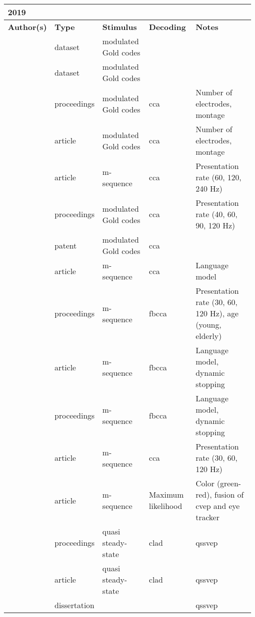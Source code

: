 \documentclass[a4paper,landscape]{article}
\begin{document}
\begin{table}[H]
	\begin{tabular}{p{5cm}p{2cm}p{5cm}p{5cm}p{6.5cm}}
		\textbf{2019} & & & & \\
		\toprule
		\textbf{Author(s)} & \textbf{Type} & \textbf{Stimulus} & \textbf{Decoding} & \textbf{Notes} \\
		\midrule
		\citeauthor{ahmadi2019dataset1} & dataset & modulated Gold codes & & \\
		\citeauthor{ahmadi2019dataset2} & dataset & modulated Gold codes & & \\
		\citeauthor{ahmadi2019a} & proceedings & modulated Gold codes & \acrshort{cca} & Number of electrodes, montage \\
		\citeauthor{ahmadi2019b} & article & modulated Gold codes & \acrshort{cca} & Number of electrodes, montage \\
		\citeauthor{basaklar2019} & article & m-sequence & \acrshort{cca} & Presentation rate (60, 120, 240 Hz) \\
		\citeauthor{borhanazad2019} & proceedings & modulated Gold codes & \acrshort{cca} & Presentation rate (40, 60, 90, 120 Hz) \\
		\citeauthor{desain2019} & patent & modulated Gold codes & \acrshort{cca} & \\
		\citeauthor{gembler2019a} & article & m-sequence & \acrshort{cca} & Language model \\
		\citeauthor{gembler2019b} & proceedings & m-sequence & \acrshort{fbcca} & Presentation rate (30, 60, 120 Hz), age (young, elderly) \\
		\citeauthor{gembler2019c} & article & m-sequence & \acrshort{fbcca} & Language model, dynamic stopping \\
		\citeauthor{gembler2019d} & proceedings & m-sequence & \acrshort{fbcca} & Language model, dynamic stopping \\
		\citeauthor{grigoryan2019} & article & m-sequence & \acrshort{cca} & Presentation rate (30, 60, 120 Hz) \\
		\citeauthor{kadiouglu2019} & article & m-sequence & Maximum likelihood & Color (green-red), fusion of \acrshort{cvep} and eye tracker \\
		\citeauthor{kaya2019a} & proceedings & quasi steady-state & \acrshort{clad} & \acrshort{qssvep} \\
		\citeauthor{kaya2019b} & article & quasi steady-state & \acrshort{clad} & \acrshort{qssvep} \\
		\citeauthor{kaya2019c} & dissertation & & & \acrshort{qssvep} \\

\end{tabular}
\end{table}
\end{document}
